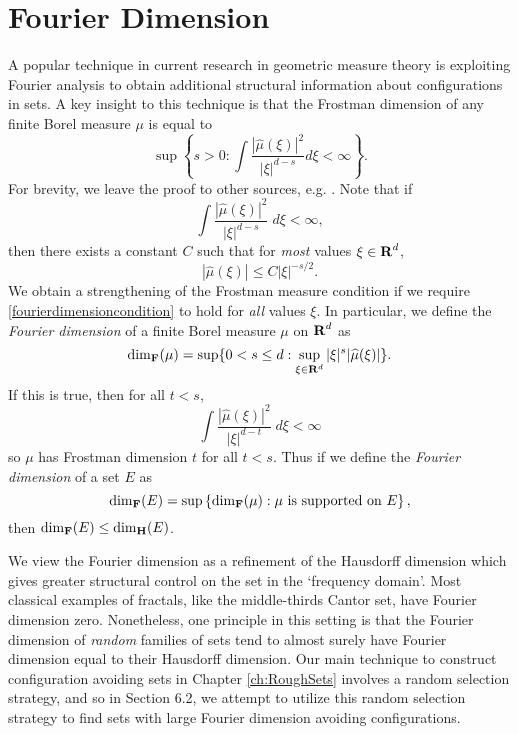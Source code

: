 \section{Fourier Dimension}

A popular technique in current research in geometric measure theory is exploiting Fourier analysis to obtain additional structural information about configurations in sets. A key insight to this technique is that the Frostman dimension of any finite Borel measure $\mu$ is equal to
%
\[ \sup \left\{ s > 0 : \int \frac{|\widehat{\mu}(\xi)|^2}{|\xi|^{d-s}} d\xi < \infty \right\}. \]
%
For brevity, we leave the proof to other sources, e.g. \cite[Section 3.5]{Matilla}. Note that if
%
\[ \int \frac{|\widehat{\mu}(\xi)|^2}{|\xi|^{d-s}}\; d\xi < \infty, \]
%
then there exists a constant $C$ such that for \emph{most} values $\xi \in \operatorname{\mathbf{R}}^d$,
%
\begin{equation} \label{fourierdimensioncondition}
    |\widehat{\mu}(\xi)| \leq C |\xi|^{-s/2}.
\end{equation}
%
We obtain a strengthening of the Frostman measure condition if we require \eqref{fourierdimensioncondition} to hold for \emph{all} values $\xi$. In particular, we define the \emph{Fourier dimension} of a finite Borel measure $\mu$ on $\operatorname{\mathbf{R}}^d$ as
%
\[ \operatorname{\dim_{\mathbf{F}}}(\mu) = \sup \{ 0 < s \leq d : \sup_{\xi \in \operatorname{\mathbf{R}}^d} |\xi|^s |\widehat{\mu}(\xi)| \}. \]
%
If this is true, then for all $t < s$,
%
\[ \int \frac{|\widehat{\mu}(\xi)|^2}{|\xi|^{d-t}}\; d\xi < \infty \]
%
so $\mu$ has Frostman dimension $t$ for all $t < s$. Thus if we define the \emph{Fourier dimension} of a set $E$ as
%
\[ \operatorname{\dim_{\mathbf{F}}}(E) = \sup \left\{ \operatorname{\dim_{\mathbf{F}}}(\mu): \mu\ \text{is supported on $E$} \right\}, \]
%
then $\operatorname{\dim_{\mathbf{F}}}(E) \leq \operatorname{\dim_{\mathbf{H}}}(E)$.

We view the Fourier dimension as a refinement of the Hausdorff dimension which gives greater structural control on the set in the `frequency domain'. Most classical examples of fractals, like the middle-thirds Cantor set, have Fourier dimension zero. Nonetheless, one principle in this setting is that the Fourier dimension of \emph{random} families of sets tend to almost surely have Fourier dimension equal to their Hausdorff dimension. Our main technique to construct configuration avoiding sets in Chapter \ref{ch:RoughSets} involves a random selection strategy, and so in Section 6.2, we attempt to utilize this random selection strategy to find sets with large Fourier dimension avoiding configurations.









